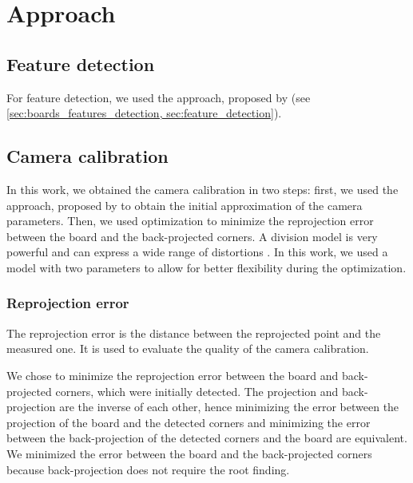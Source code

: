 \chapter{Approach}\label{cha:approach}

\section{Feature detection}\label{sec:feature_detection}

For feature detection, we used the approach, proposed by
\cite{geigerAutomaticCameraRange2012} (see \cref{sec:boards_features_detection,
	sec:feature_detection}).

\section{Camera calibration}\label{sec:camera_calibration}

In this work, we obtained the camera calibration in two steps: first, we
used the approach, proposed by \cite{scaramuzzaToolboxEasilyCalibrating2006} to
obtain the initial approximation of the camera parameters. Then, we used 
optimization to minimize the reprojection error between the board and the
back-projected corners. A division model is very powerful and can
express a wide range of distortions
\citep{prittsMinimalSolversRectifying2021}. In this work, we used a model with
two parameters to allow for better flexibility during the optimization.

\subsection{Reprojection error}\label{sub:reprojection_error}

The reprojection error is the distance between the reprojected point and the
measured one. It is used to evaluate the quality of the camera calibration.

We chose to minimize the reprojection error between the board and back-projected
corners, which were initially detected. The projection and back-projection are
the inverse of each other, hence minimizing the error between the projection of
the board and the detected corners and minimizing the error between the
back-projection of the detected corners and the board are
equivalent. We minimized the error
between the board and the back-projected corners because back-projection does
not require the root finding.


